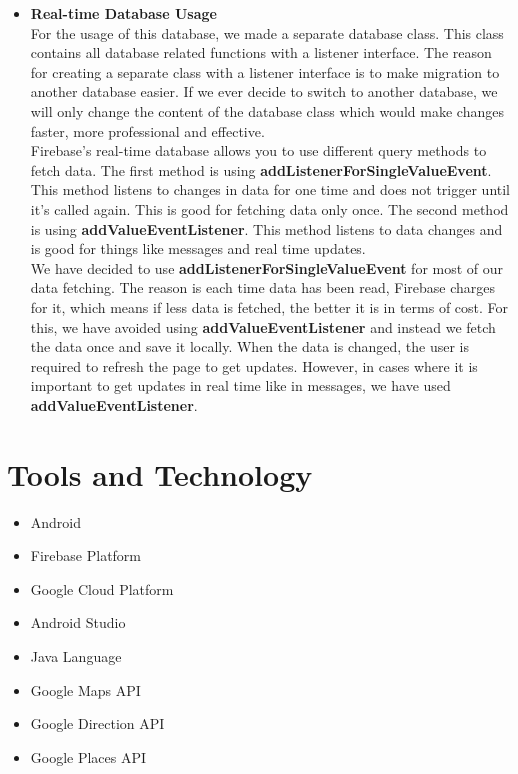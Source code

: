 \begin{itemize}
	
\item \textbf{Real-time Database Usage }\\

For the usage of this database, we made a separate database class. This class contains all database related functions with a listener interface. The reason for creating a separate class with a listener interface is to make migration to another database easier. If we ever decide to switch to another database, we will only change the content of the database class which would make changes faster, more professional and effective.\\

Firebase's real-time database allows you to use different query methods to fetch data. The first method is using \textbf{addListenerForSingleValueEvent}. This method listens to changes 
in data for one time and does not trigger until it’s called again. This is good for fetching data only once. The second method is using \textbf{addValueEventListener}. This method listens to data changes and is good for things like messages and real time updates.\\

We have decided to use \textbf{addListenerForSingleValueEvent} for most of our data fetching. The reason is each time data has been read, Firebase charges for it, which means if less data is fetched, the better it is in terms of cost. For this, we have avoided using \textbf{ addValueEventListener} and instead we fetch the data once and save it locally. When the data is changed, the user is required to refresh the page to get updates. However, in cases where it is important to get updates in real time like in messages, we have used \textbf{addValueEventListener}.
 
\end{itemize}

\section{Tools and Technology}
\begin{itemize}
\item Android
\item Firebase Platform
\item Google Cloud Platform
\item Android Studio
\item Java Language
\item Google Maps API
\item Google Direction API
\item Google Places API
\end{itemize}

